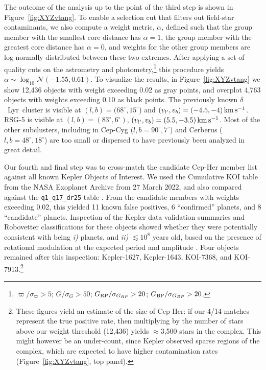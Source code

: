 \documentclass[12pt,twocolumn]{aastex63}
\newcommand{\mkms}{{\rm \,km\,s^{-1}}}  %
\begin{document}
The outcome of the analysis up to the point of the third step is shown
in Figure~\ref{fig:XYZvtang}.  To enable a selection cut that filters
out field-star contaminants, we also compute a weight metric,
$\alpha$, defined such that the group member with the smallest core
distance has $\alpha=1$, the group member with the greatest core
distance has $\alpha=0$, and weights for the other group members are
log-normally distributed between these two extremes.  After applying a
set of quality cuts on the astrometry and
photometry,\footnote{$\varpi/\sigma_\varpi>5$; $G/\sigma_{G}>50$;
$G_{\rm RP}/\sigma_{G_{RP}}>20$; $G_{\rm BP}/\sigma_{G_{BP}}>20$.}
this procedure yields $\alpha \sim \log_{10}\mathcal{N}(-1.55,0.61)$.
To visualize the results, in Figure~\ref{fig:XYZvtang} we show
12{,}436 objects with weight exceeding 0.02 as gray points, and
overplot 4{,}763 objects with weights exceeding 0.10 as black points.
The previously known $\delta$~Lyr\ cluster is visible at
$(l,b)=(68^\circ,15^\circ$) and $(v_{l'}, v_b)=(-4.5 ,-4 )\mkms$.
RSG-5 is visible at $(l,b)=(83^\circ,6^\circ)$, $(v_{l'}, v_b)=(5.5
,-3.5 )\mkms$.  Most of the other subclusters, including in Cep-Cyg
($l,b=90^\circ,7^\circ$) and Cerberus ($l,b=48^\circ,18^\circ$) are
too small or dispersed to have previously been analyzed in great
detail.

%
%
Our fourth and final step was to cross-match the candidate Cep-Her
member list against all known Kepler Objects of Interest.  We used the
Cumulative KOI table from the NASA Exoplanet Archive from 27 March
2022, and also compared against the \texttt{q1\_q17\_dr25} table
\citep{thompson_planetary_2018}.  From the candidate members
with weights exceeding 0.02, this 
 yielded 11 known false positives, 6 ``confirmed'' planets, and 8
 ``candidate'' planets.  
Inspection of the Kepler data validation summaries and Robovetter
classifications for these objects showed whether they were
potentially consistent with being {\it i)} planets, and {\it ii)}
$\lesssim 10^8$ years old, based on the presence of rotational
modulation at the expected period and amplitude \citep[{e.g.},][Figure~9]{rebull_rotation_2020}.  Four objects remained after
this inspection: Kepler-1627, Kepler-1643, KOI-7368, and
KOI-7913.\footnote{These figures
yield an estimate of the size of Cep-Her: if our 4/14
matches represent the true positive rate, then
multiplying by the number of stars above our weight threshold
(12{,}436) yields $\approx$3{,}500 stars in the complex.  
This might however be an under-count,
since Kepler observed sparse 
regions of the complex, which are expected to have higher
contamination rates (Figure~\ref{fig:XYZvtang}, top panel).}
\end{document}
